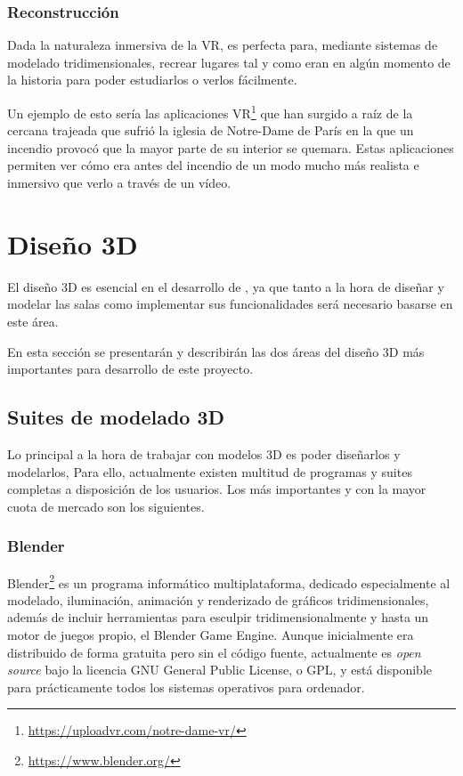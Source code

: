 \subsubsection{Reconstrucción}

Dada la naturaleza inmersiva de la \acs{VR}, es perfecta para, mediante sistemas de modelado tridimensionales, recrear lugares tal y como eran en algún momento de la historia para poder estudiarlos o verlos fácilmente.

Un ejemplo de esto sería las aplicaciones \acs{VR}\footnote{\url{https://uploadvr.com/notre-dame-vr/}} que han surgido a raíz de la cercana trajeada que sufrió la iglesia de Notre-Dame de París en la que un incendio provocó que la mayor parte de su interior se quemara. Estas aplicaciones permiten ver cómo era antes del incendio de un modo mucho más realista e inmersivo que verlo a través de un vídeo.

\section{Diseño 3D}

El diseño 3D es esencial en el desarrollo de \MineRVa, ya que tanto a la hora de diseñar y modelar las salas como implementar sus funcionalidades será necesario basarse en este área.

En esta sección se presentarán y describirán las dos áreas del diseño 3D más importantes para desarrollo de este proyecto.

\subsection{Suites de modelado 3D}

Lo principal a la hora de trabajar con modelos 3D es poder diseñarlos y modelarlos, Para ello, actualmente existen multitud de programas y suites completas a disposición de los usuarios. Los más importantes y con la mayor cuota de mercado son los siguientes. 

\subsubsection{Blender}

Blender\footnote{\url{https://www.blender.org/}} es un programa informático multiplataforma, dedicado especialmente al modelado, iluminación, animación y renderizado de gráficos tridimensionales, además de incluir herramientas para esculpir tridimensionalmente y hasta un motor de juegos propio, el Blender Game Engine. Aunque inicialmente era distribuido de forma gratuita pero sin el código fuente, actualmente es \textit{open source} bajo la licencia GNU General Public License, o GPL, y está disponible para prácticamente todos los sistemas operativos para ordenador.


